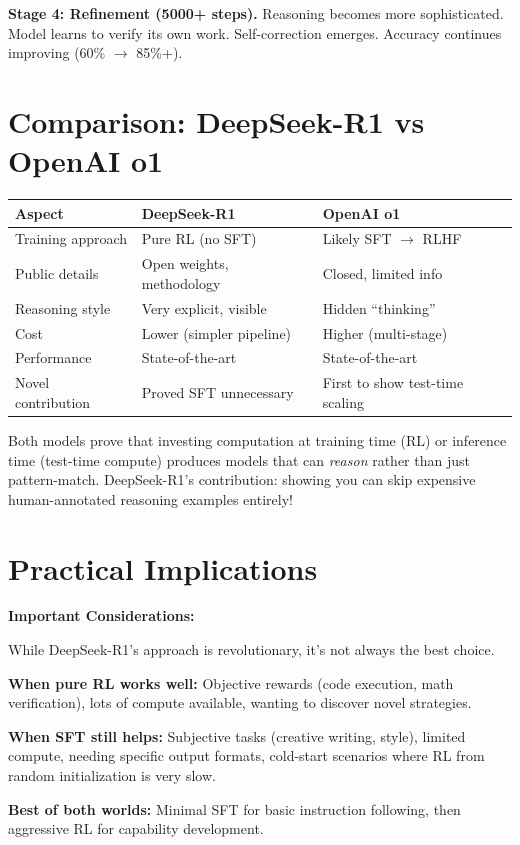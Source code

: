\begin{chapterenv}
\textbf{Stage 4: Refinement (5000+ steps).} Reasoning becomes more sophisticated. Model learns to verify its own work. Self-correction emerges. Accuracy continues improving (60\% $\to$ 85\%+).

\section{Comparison: DeepSeek-R1 vs OpenAI o1}

\begin{center}
\begin{tabular}{p{}p{}p{}}
\toprule
\textbf{Aspect} & \textbf{DeepSeek-R1} & \textbf{OpenAI o1} \\
\midrule
Training approach & Pure RL (no SFT) & Likely SFT $\to$ RLHF \\
Public details & Open weights, methodology & Closed, limited info \\
Reasoning style & Very explicit, visible & Hidden ``thinking'' \\
Cost & Lower (simpler pipeline) & Higher (multi-stage) \\
Performance & State-of-the-art & State-of-the-art \\
Novel contribution & Proved SFT unnecessary & First to show test-time scaling \\
\bottomrule
\end{tabular}
\end{center}

\begin{tipbox}
Both models prove that investing computation at training time (RL) or inference time (test-time compute) produces models that can \textit{reason} rather than just pattern-match. DeepSeek-R1's contribution: showing you can skip expensive human-annotated reasoning examples entirely!
\end{tipbox}

\section{Practical Implications}

\begin{infobox}
\textbf{Important Considerations:}

While DeepSeek-R1's approach is revolutionary, it's not always the best choice.

\textbf{When pure RL works well:} Objective rewards (code execution, math verification), lots of compute available, wanting to discover novel strategies.

\textbf{When SFT still helps:} Subjective tasks (creative writing, style), limited compute, needing specific output formats, cold-start scenarios where RL from random initialization is very slow.

\textbf{Best of both worlds:} Minimal SFT for basic instruction following, then aggressive RL for capability development.
\end{infobox}

\end{chapterenv}